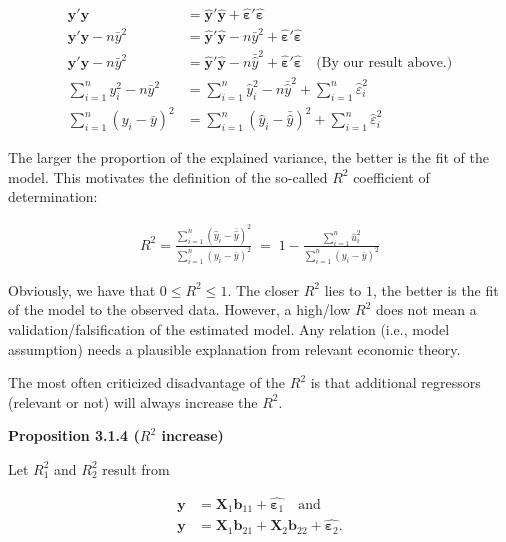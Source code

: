\documentclass[]{book}
\theoremstyle{definition}
\theoremstyle{definition}
\theoremstyle{definition}
\theoremstyle{remark}
\begin{document}
\begin{align*}
\mathbf{y}'\mathbf{y} &= \hat{\mathbf{y}}'\hat{\mathbf{y}}+\hat{\boldsymbol{\varepsilon}}'\hat{\boldsymbol{\varepsilon}} \\
       \mathbf{y}'\mathbf{y} -n\bar{y}^2 &= \hat{\mathbf{y}}'\hat{\mathbf{y}}-n\bar{y}^2+\hat{\boldsymbol{\varepsilon}}'\hat{\boldsymbol{\varepsilon}} \\
       \mathbf{y}'\mathbf{y}-n\bar{y}^2 &= \hat{\mathbf{y}}'\hat{\mathbf{y}}-n\bar{\hat{y}}^2+\hat{\boldsymbol{\varepsilon}}'
       \hat{\boldsymbol{\varepsilon}}\quad\text{(By our result above.)} \\
       \sum_{i=1}^n y_i^2-n\bar{y}^2 &= \sum_{i=1}^n\hat{y}_i^2-n\bar{\hat{y}}^2+\sum_{i=1}^n\hat{\varepsilon}_i^2 \\
       \sum_{i=1}^n (y_i-\bar{y})^2 &= \sum_{i=1}^n (\hat{y}_i-\bar{\hat{y}})^2+\sum_{i=1}^n \hat{\varepsilon}_i^2
\end{align*}

The larger the proportion of the explained variance, the better is the
fit of the model. This motivates the definition of the so-called \(R^2\)
coefficient of determination:

\[
\begin{align*}
  R^2=\frac{\sum_{i=1}^n\left(\hat{y}_i-\bar{\hat{y}}\right)^2}{\sum_{i=1}^n\left(y_i-\bar{y}\right)^2}\;=\;1-\frac{\sum_{i=1}^n\hat{u}_i^2}{\sum_{i=1}^n\left(y_i-\bar{y}\right)^2}
\end{align*}
\]

Obviously, we have that \(0\leq R^2\leq 1\). The closer \(R^2\) lies to \(1\),
the better is the fit of the model to the observed data. However, a
high/low \(R^2\) does not mean a validation/falsification of the estimated
model. Any relation (i.e., model assumption) needs a plausible
explanation from relevant economic theory.

The most often criticized disadvantage of the \(R^2\) is that additional
regressors (relevant or not) will always increase the \(R^2\).

\textbf{Proposition 3.1.4 (\(R^2\) increase)}

Let \(R^2_1\) and \(R^2_2\) result from

\[
\begin{align*}
    \mathbf{y} &= \mathbf{X}_1\mathbf{b}_{11}+\hat{\boldsymbol{\varepsilon}_1} \quad\text{and}\\
    \mathbf{y} &= \mathbf{X}_1\mathbf{b}_{21}+\mathbf{X}_2\mathbf{b}_{22}+\hat{\boldsymbol{\varepsilon}_2}.
\end{align*}
\]
\end{document}
